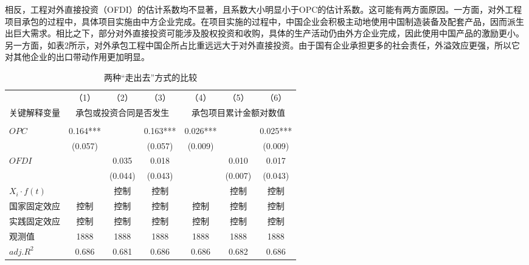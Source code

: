 \documentclass[a4paper,12pt]{article}
\newcommand{\sym}[1]{#1}
\begin{document}
\vspace{0.5em}  %

相反，工程对外直接投资（OFDI）的估计系数均不显著，且系数大小明显小于OPC的估计系数。这可能有两方面原因。一方面，对外工程项目承包的过程中，具体项目实施由中方企业完成。在项目实施的过程中，中国企业会积极主动地使用中国制造装备及配套产品，因而派生出巨大需求。相比之下，部分对外直接投资可能涉及股权投资和收购，具体的生产活动仍由外方企业完成，因此使用中国产品的激励更小。另一方面，如表2所示，对外承包工程中国企所占比重远远大于对外直接投资。由于国有企业承担更多的社会责任，外溢效应更强，所以它对其他企业的出口带动作用更加明显。 

\begin{table} [ht] \footnotesize
	\newcommand{\tabincell}[2]{\begin{tabular}{@{}#1@{}}#2\end{tabular}}  %
	\centering
	\captionsetup{labelformat=default,labelsep=period}
	\caption{两种“走出去”方式的比较}\label{table9}
	\begin{tabular}{lcccccc}
		\toprule
		&（1）&（2）&（3）&（4）&（5）&（6）\\
		关键解释变量	&\multicolumn{3}{c}{承包或投资合同是否发生} &\multicolumn{3}{c}{承包项目累计金额对数值}  \\
		\cline{1-7} \\
		\vspace{0.05em}  %
		$OPC$ &0.164\sym{***} & &0.163\sym{***} &0.026\sym{***}&&0.025\sym{***} \\
			  &(0.057)   	  &  &(0.057)       &(0.009)       &    &(0.009)  \\
		$OFDI$ & & 0.035		&0.018			&&0.010       &0.017 \\
			   & &(0.044)        &(0.043)       &&(0.007)       &(0.043)  \\
		$X_{i}·f(t)$  & &控制 &控制 & &控制 &控制 \\
		国家固定效应  & 控制&控制 &控制 &控制 &控制 &控制 \\
		实践固定效应  & 控制&控制 &控制 &控制 &控制 &控制 \\
		观测值 &1888&1888&1888&1888&1888&1888\\
		$adj.R^{2}$ &0.686&	0.681&	0.686&	0.686&	0.682&	0.686\\
		\bottomrule
	\end{tabular}
\end{table}
\end{document}
